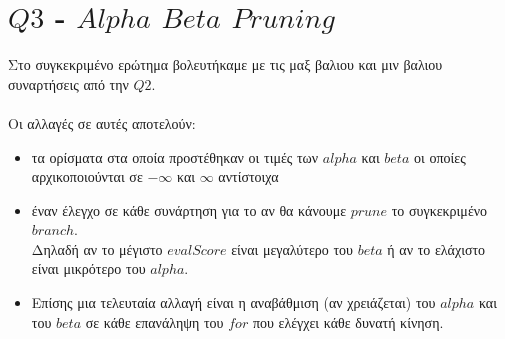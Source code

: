 \documentclass[12pt]{article}
\begin{document}
\section*{$Q3$ - $Alpha$ $Beta$ $Pruning$}
Στο συγκεκριμένο ερώτημα βολευτήκαμε με τις μαξ βαλιου και μιν βαλιου συναρτήσεις από την $Q2$.\\\\
Οι αλλαγές σε αυτές αποτελούν:
\begin{itemize}
    \item τα ορίσματα στα οποία προστέθηκαν οι τιμές των $alpha$ και $beta$ οι οποίες αρχικοποιούνται σε $-\infty$ και $\infty$ αντίστοιχα
    \item έναν έλεγχο σε κάθε συνάρτηση για το αν θα κάνουμε $prune$ το συγκεκριμένο $branch$.\\
    Δηλαδή αν το μέγιστο $evalScore$ είναι μεγαλύτερο του $beta$ ή αν το ελάχιστο είναι μικρότερο του $alpha$.
    \item   Επίσης μια τελευταία αλλαγή είναι η αναβάθμιση (αν χρειάζεται) του $alpha$ και του $beta$ σε κάθε επανάληψη του $for$ που ελέγχει κάθε δυνατή κίνηση.
\end{itemize}
\end{document}
